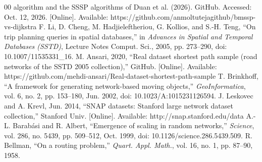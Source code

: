 \documentclass[conference,a4paper]{IEEEtran}
\begin{document}
\begin{thebibliography}{00}
{algorithm and the SSSP algorithms of Duan et al.} (2026). GitHub. Accessed: Oct. 12, 2026.
[Online]. Available: https://github.com/anmoltutejagithub/bmssp-vs-dijkstra
 F. Li, D. Cheng, M. Hadjieleftheriou, G. Kollios, and S.-H. Teng, ``On trip
planning queries in spatial databases,'' in \emph{Advances in Spatial and Temporal Databases
(SSTD)}, Lecture Notes Comput. Sci., 2005, pp. 273--290, doi: 10.1007/11535331\_16.
 M. Ansari, 2020, ``Real dataset shortest path sample (road networks of the
SSTD 2005 collection),'' GitHub. [Online]. Available:
https://github.com/mehdi-ansari/Real-dataset-shortest-path-sample
 T. Brinkhoff, ``A framework for generating network-based moving
objects,'' \emph{GeoInformatica}, vol. 6, no. 2, pp. 153--180, Jun. 2002, doi:
10.1023/A:1015231126594.
 J. Leskovec and A. Krevl, Jun. 2014, ``SNAP datasets: Stanford large network
dataset collection,'' Stanford Univ. [Online]. Available: http://snap.stanford.edu/data
 A.-L. Barab\'asi and R. Albert, ``Emergence of scaling in random
networks,'' \emph{Science}, vol. 286, no. 5439, pp. 509--512, Oct. 1999, doi:
10.1126/science.286.5439.509.
 R. Bellman, ``On a routing problem,'' \emph{Quart. Appl. Math.}, vol. 16,
no. 1, pp. 87--90, 1958.
\end{thebibliography}
\end{document}

